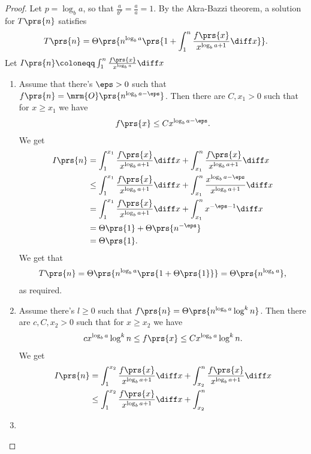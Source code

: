 \documentclass[oneside]{scrbook}
\theoremstyle{definition}
\begin{document}
\begin{exercise}
\begin{proof}
Let $p = \log_b a$, so that $\frac{a}{b^p} = \frac{a}{a} = 1$. By the Akra-Bazzi theorem, a solution for $T\prs{n}$ satisfies
\begin{align*}
T\prs{n} = \Theta\prs{n^{\log_b a} \prs{1 + \int_1^n \frac{f\prs{x}}{x^{\log_b a + 1}} \diff x}} \text{.}
\end{align*}
Let $I\prs{n} \coloneqq \int_1^n \frac{f\prs{x}}{x^{\log_b a}} \diff x$
\begin{enumerate}
\item Assume that there's $\eps > 0$ such that $f\prs{n} = \mrm{O}\prs{n^{\log_b a - \eps}}$. Then there are $C, x_1 > 0$ such that for $x \geq x_1$ we have
\begin{align*}
f\prs{x} \leq C x^{\log_b a - \eps} \text{.}
\end{align*}
We get
\begin{align*}
I\prs{n} &= \int_1^{x_1} \frac{f\prs{x}}{x^{\log_b a + 1}} \diff x + \int_{x_1}^{n} \frac{f\prs{x}}{x^{\log_b a + 1}} \diff x
\\&\leq \int_1^{x_1} \frac{f\prs{x}}{x^{\log_b a + 1}} \diff x + \int_{x_1}^{n} \frac{x^{\log_b a - \eps}}{x^{\log_b a + 1}} \diff x
\\&= \int_1^{x_1} \frac{f\prs{x}}{x^{\log_b a + 1}} \diff x + \int_{x_1}^{n} x^{-\eps-1} \diff x
\\&= \Theta\prs{1} + \Theta\prs{n^{-\eps}}
\\&= \Theta\prs{1} \text{.}
\end{align*}
We get that
\begin{align*}
T\prs{n} = \Theta\prs{n^{\log_b a} \prs{1 + \Theta\prs{1}}} = \Theta\prs{n^{\log_b a}} \text{,}
\end{align*}
as required.
\item
Assume there's $l \geq 0$ such that $f\prs{n} = \Theta\prs{n^{\log_ba} \log^k n}$.
Then there are $c, C, x_2 > 0$ such that for $x \geq x_2$ we have
\begin{align*}
c x^{\log_b a} \log^k n \leq f\prs{x} \leq C x^{\log_b a} \log^k n \text{.}
\end{align*}
We get
\begin{align*}
I\prs{n} &= \int_1^{x_2} \frac{f\prs{x}}{x^{\log_b a + 1}} \diff x + \int_{x_2}^{n} \frac{f\prs{x}}{x^{\log_b a + 1}} \diff x
\\&\leq \int_1^{x_2} \frac{f\prs{x}}{x^{\log_b a + 1}} \diff x + \int_{x_2}^n 
\end{align*}

\item
\end{enumerate}
\end{proof}
\end{exercise}
\end{document}
